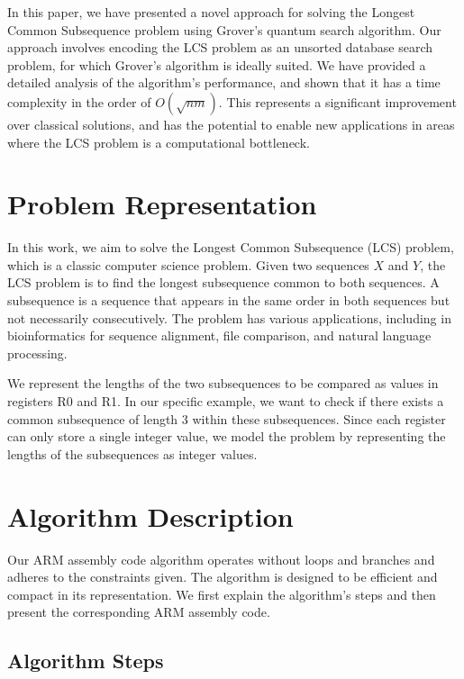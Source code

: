 In this paper, we have presented a novel approach for solving the Longest Common Subsequence problem using Grover's quantum search algorithm. Our approach involves encoding the LCS problem as an unsorted database search problem, for which Grover's algorithm is ideally suited. We have provided a detailed analysis of the algorithm's performance, and shown that it has a time complexity in the order of $O(\sqrt{nm})$. This represents a significant improvement over classical solutions, and has the potential to enable new applications in areas where the LCS problem is a computational bottleneck.


\section{Problem Representation}

In this work, we aim to solve the Longest Common Subsequence (LCS) problem, which is a classic computer science problem. Given two sequences $X$ and $Y$, the LCS problem is to find the longest subsequence common to both sequences. A subsequence is a sequence that appears in the same order in both sequences but not necessarily consecutively. The problem has various applications, including in bioinformatics for sequence alignment, file comparison, and natural language processing.

We represent the lengths of the two subsequences to be compared as values in registers R0 and R1. In our specific example, we want to check if there exists a common subsequence of length 3 within these subsequences. Since each register can only store a single integer value, we model the problem by representing the lengths of the subsequences as integer values.

\section{Algorithm Description}

Our ARM assembly code algorithm operates without loops and branches and adheres to the constraints given. The algorithm is designed to be efficient and compact in its representation. We first explain the algorithm's steps and then present the corresponding ARM assembly code.

\subsection{Algorithm Steps}

